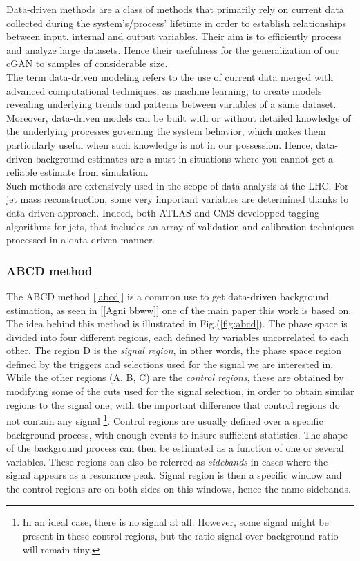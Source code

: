 Data-driven methods are a class of methods that primarily rely on current data collected during the system's/process' lifetime in order to establish relationships between input, internal and output variables. Their aim is to efficiently process and analyze large datasets. Hence their usefulness for the generalization of our cGAN to samples of considerable size.\\
The term data-driven modeling refers to the use of current data merged with advanced computational techniques, as machine learning, to create models revealing underlying trends and patterns between variables of a same dataset. Moreover, data-driven models can be built with or without detailed knowledge of the underlying processes governing the system behavior, which makes them particularly useful when such knowledge is not in our possession. Hence, data-driven background estimates are a must in situations where you cannot get a reliable estimate from simulation.\\

Such methods are extensively used in the scope of data analysis at the LHC. For jet mass reconstruction, some very important variables are determined thanks to data-driven approach. Indeed, both ATLAS and CMS developped tagging algorithms for jets, that includes an array of validation and calibration techniques processed in a data-driven manner.

\subsubsection{ABCD method}

The ABCD method [\ref{abcd}] is a common use to get data-driven background estimation, as seen in [\ref{Agni bbww}] one of the main paper this work is based on. The idea behind this method is illustrated in Fig.(\ref{fig:abcd}).
The phase space is divided into four different regions, each defined by variables uncorrelated to each other. The region D is the \textit{signal region}, in other words, the phase space region defined by the triggers and selections used for the signal we are interested in. While the other regions (A, B, C) are the \textit{control regions}, these are obtained by modifying some of the cuts used for the signal selection, in order to obtain similar regions to the signal one, with the important difference that control regions do not contain any signal \footnote{In an ideal case, there is no signal at all. However, some signal might be present in these control regions, but the ratio signal-over-background ratio will remain tiny.}.  Control regions are usually defined over a specific background process, with enough events to insure sufficient statistics. The shape of the background process can then be estimated as a function of one or several variables.
These regions can also be referred as \textit{sidebands} in cases where the signal appears as a resonance peak. Signal region is then a specific window and the control regions are on both sides on this windows, hence the name sidebands.

